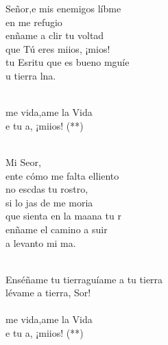 \begin{cancion}%
	 Señor,e mis enemigos líbme\\
	en  me refugio\\
	enñame a clir tu voltad\\
	que Tú eres miios, ¡mios!\\
	tu Esritu que es bueno mguíe\\
	 u tierra lna.\\\jump\\
	\begin{chorus}%
	me vida,ame la Vida\\
	e tu a, ¡miios! (**)\\
	\end{chorus}%
	\jump\\
	Mi Seor, \\
	ente cómo me falta elliento\\
	no escdas tu rostro, \\
	si lo jas de  me moria \\
	 que sienta en la maana tu r\\
	enñame el camino a suir  \\
	a  levanto mi ma.\\\jump\\
	\begin{chorus}%
	Enséñame tu tierraguíame a tu tierra\\
	lévame a tierra, Sor! \\
\jump\\
	me vida,ame la Vida\\
	e tu a, ¡miios! (**)\\
	\end{chorus}%
	\jump\\
\end{cancion}%
